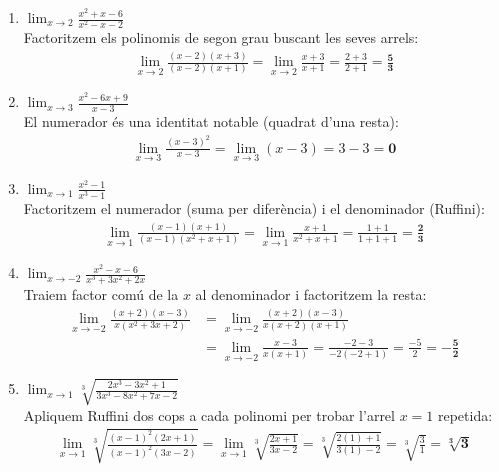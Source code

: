 \documentclass[12pt,a4paper]{article}
\begin{document}
\begin{enumerate}[label=\textbf{3.\arabic*.}, leftmargin=*, itemsep=0.8cm]

    \item $\displaystyle \lim_{x \to 2} \frac{x^2+x-6}{x^2-x-2}$ \\
    Factoritzem els polinomis de segon grau buscant les seves arrels:
    \begin{align*}
        \lim_{x \to 2} \frac{(x-2)(x+3)}{(x-2)(x+1)} = \lim_{x \to 2} \frac{x+3}{x+1} = \frac{2+3}{2+1} = \mathbf{\frac{5}{3}}
    \end{align*}

    \item $\displaystyle \lim_{x \to 3} \frac{x^2-6x+9}{x-3}$ \\
    El numerador és una identitat notable (quadrat d'una resta):
    \begin{align*}
        \lim_{x \to 3} \frac{(x-3)^2}{x-3} = \lim_{x \to 3} (x-3) = 3 - 3 = \mathbf{0}
    \end{align*}

    \item $\displaystyle \lim_{x \to 1} \frac{x^2-1}{x^3-1}$ \\
    Factoritzem el numerador (suma per diferència) i el denominador (Ruffini):
    \begin{align*}
        \lim_{x \to 1} \frac{(x-1)(x+1)}{(x-1)(x^2+x+1)} = \lim_{x \to 1} \frac{x+1}{x^2+x+1} = \frac{1+1}{1+1+1} = \mathbf{\frac{2}{3}}
    \end{align*}

    \item $\displaystyle \lim_{x \to -2} \frac{x^2-x-6}{x^3+3x^2+2x}$ \\
    Traiem factor comú de la $x$ al denominador i factoritzem la resta:
    \begin{align*}
        \lim_{x \to -2} \frac{(x+2)(x-3)}{x(x^2+3x+2)} &= \lim_{x \to -2} \frac{(x+2)(x-3)}{x(x+2)(x+1)} \\
        &= \lim_{x \to -2} \frac{x-3}{x(x+1)} = \frac{-2-3}{-2(-2+1)} = \frac{-5}{2} = \mathbf{-\frac{5}{2}}
    \end{align*}

    \item $\displaystyle \lim_{x \to 1} \sqrt[3]{\frac{2x^3-3x^2+1}{3x^3-8x^2+7x-2}}$ \\
    Apliquem Ruffini dos cops a cada polinomi per trobar l'arrel $x=1$ repetida:
    \begin{align*}
        \lim_{x \to 1} \sqrt[3]{\frac{(x-1)^2(2x+1)}{(x-1)^2(3x-2)}} = \lim_{x \to 1} \sqrt[3]{\frac{2x+1}{3x-2}} = \sqrt[3]{\frac{2(1)+1}{3(1)-2}} = \sqrt[3]{\frac{3}{1}} = \mathbf{\sqrt[3]{3}}
    \end{align*}


\end{enumerate}
\end{document}
